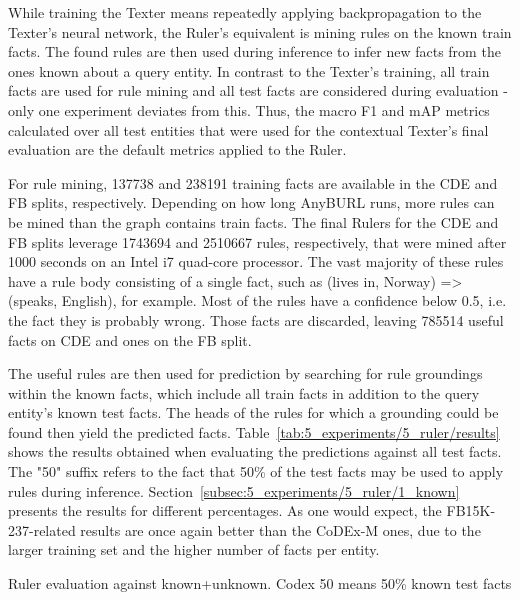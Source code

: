 While training the Texter means repeatedly applying backpropagation to the Texter's neural network, the Ruler's equivalent is mining rules on the known train facts. The found rules are then used during inference to infer new facts from the ones known about a query entity. In contrast to the Texter's training, all train facts are used for rule mining and all test facts are considered during evaluation - only one experiment deviates from this. Thus, the macro F1 and mAP metrics calculated over all test entities that were used for the contextual Texter's final evaluation are the default metrics applied to the Ruler.

For rule mining, \num{137738} and \num{238191} training facts are available in the CDE and FB splits, respectively. Depending on how long AnyBURL runs, more rules can be mined than the graph contains train facts. The final Rulers for the CDE and FB splits leverage \num{1743694} and \num{2510667} rules, respectively, that were mined after \num{1000} seconds on an Intel i7 quad-core processor. The vast majority of these rules have a rule body consisting of a single fact, such as (lives in, Norway) => (speaks, English), for example. Most of the rules have a confidence below 0.5, i.e. the fact they is probably wrong. Those facts are discarded, leaving \num{785514} useful facts on CDE and \num{} ones on the FB split.

The useful rules are then used for prediction by searching for rule groundings within the known facts, which include all train facts in addition to the query entity's known test facts. The heads of the rules for which a grounding could be found then yield the predicted facts. Table~\ref{tab:5_experiments/5_ruler/results} shows the results obtained when evaluating the predictions against all test facts. The "50" suffix refers to the fact that 50\% of the test facts may be used to apply rules during inference. Section~\ref{subsec:5_experiments/5_ruler/1_known} presents the results for different percentages. As one would expect, the FB15K-237-related results are once again better than the CoDEx-M ones, due to the larger training set and the higher number of facts per entity.

\begin{table}[h]
    \centering
    
    \caption{Ruler evaluation against known+unknown. Codex 50 means 50\% known test facts}
    \label{tab:5_experiments/5_ruler/results}
\end{table}

